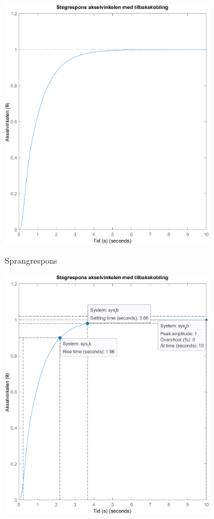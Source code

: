 \begin{figure}[h]
	\centering
	\begin{subfigure}[a]{0.450\textwidth}
		\centering
		\includegraphics[width = \textwidth]{Images/h_StepResponse.png}
		\caption{}{Sprangrespons}
	\end{subfigure}
	\begin{subfigure}[a]{0.450\textwidth}
		\centering
		\includegraphics[width = \textwidth]{Images/h_StepResponseCharacterisics.png}

\end{subfigure}
\end{figure}
